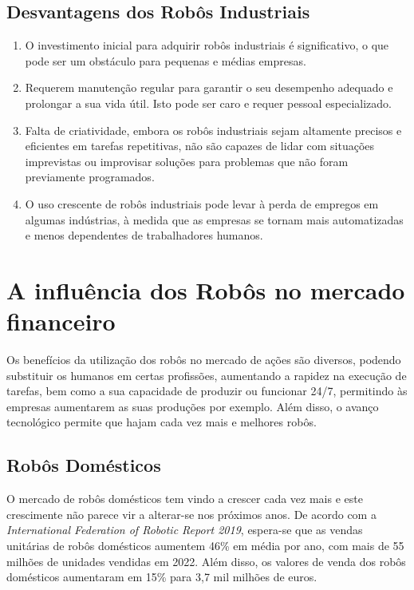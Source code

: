 \documentclass[10pt]{article}
\begin{document}
\subsection{Desvantagens dos Robôs Industriais\cite{stevens_2022}}

\begin{enumerate} 
    \item O investimento inicial para adquirir robôs industriais é significativo, o que pode ser um obstáculo para pequenas e médias empresas.
    \item Requerem manutenção regular para garantir o seu desempenho adequado e prolongar a sua vida útil. Isto pode ser caro e requer pessoal especializado.
    \item Falta de criatividade, embora os robôs industriais sejam altamente precisos e eficientes em tarefas repetitivas, não são capazes de lidar com situações imprevistas ou improvisar soluções para problemas que não foram previamente programados.
    \item O uso crescente de robôs industriais pode levar à perda de empregos em algumas indústrias, à medida que as empresas se tornam mais automatizadas e menos dependentes de trabalhadores humanos.
\end{enumerate}


\newpage


\section{A influência dos Robôs no mercado financeiro}
\hspace{\parindent}Os benefícios da utilização dos robôs no mercado de ações são diversos\cite{market}, podendo substituir os humanos em certas profissões, aumentando a rapidez na execução de tarefas, bem como a sua capacidade de produzir ou funcionar 24/7, permitindo às empresas aumentarem as suas produções por exemplo. Além disso, o avanço tecnológico permite que hajam cada vez mais e melhores robôs.

\subsection{Robôs Domésticos}
\hspace{\parindent}O mercado de robôs domésticos\cite{international} tem vindo a crescer cada vez mais e este crescimente não parece vir a alterar-se nos próximos anos. De acordo com a \textit{International Federation of Robotic Report 2019}, espera-se que as vendas unitárias de robôs domésticos aumentem 46\% em média por ano, com mais de 55 milhões de unidades vendidas em 2022. Além disso, os valores de venda dos robôs domésticos aumentaram em 15\% para 3,7 mil milhões de euros. 
\end{document}
